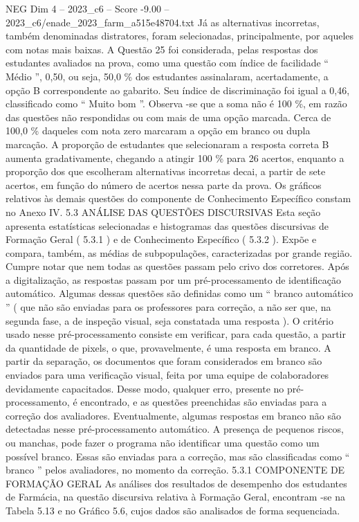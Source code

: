\begin{textsample}{NEG Dim 4 – 2023\_c6 – Score -9.00 – 2023\_c6/enade\_2023\_farm\_a515e48704.txt}
Já as alternativas incorretas, também denominadas distratores, foram selecionadas, principalmente, por aqueles com notas mais baixas.
A Questão 25 foi considerada, pelas respostas dos estudantes avaliados na prova, como uma questão com índice de facilidade “ Médio ”, 0,50, ou seja, 50,0 \% dos estudantes assinalaram, acertadamente, a opção B correspondente ao gabarito.
Seu índice de discriminação foi igual a 0,46, classificado como “ Muito bom ”.
Observa -se que a soma não é 100 \%, em razão das questões não respondidas ou com mais de uma opção marcada.
Cerca de 100,0 \% daqueles com nota zero marcaram a opção em branco ou dupla marcação.
A proporção de estudantes que selecionaram a resposta correta B aumenta gradativamente, chegando a atingir 100 \% para 26 acertos, enquanto a proporção dos que escolheram alternativas incorretas decai, a partir de sete acertos, em função do número de acertos nessa parte da prova.
Os gráficos relativos às demais questões do componente de Conhecimento Específico constam no Anexo IV. 5.3 ANÁLISE DAS QUESTÕES DISCURSIVAS Esta seção apresenta estatísticas selecionadas e histogramas das questões discursivas de Formação Geral ( 5.3.1 ) e de Conhecimento Específico ( 5.3.2 ).
Expõe e compara, também, as médias de subpopulações, caracterizadas por grande região.
Cumpre notar que nem todas as questões passam pelo crivo dos corretores.
Após a digitalização, as respostas passam por um pré-processamento de identificação automático.
Algumas dessas questões são definidas como um “ branco automático ” ( que não são enviadas para os professores para correção, a não ser que, na segunda fase, a de inspeção visual, seja constatada uma resposta ).
O critério usado nesse pré-processamento consiste em verificar, para cada questão, a partir da quantidade de pixels, o que, provavelmente, é uma resposta em branco.
A partir da separação, os documentos que foram considerados em branco são enviados para uma verificação visual, feita por uma equipe de colaboradores devidamente capacitados.
Desse modo, qualquer erro, presente no pré-processamento, é encontrado, e as questões preenchidas são enviadas para a correção dos avaliadores.
Eventualmente, algumas respostas em branco não são detectadas nesse pré-processamento automático.
A presença de pequenos riscos, ou manchas, pode fazer o programa não identificar uma questão como um possível branco.
Essas são enviadas para a correção, mas são classificadas como “ branco ” pelos avaliadores, no momento da correção. 5.3.1 COMPONENTE DE FORMAÇÃO GERAL As análises dos resultados de desempenho dos estudantes de Farmácia, na questão discursiva relativa à Formação Geral, encontram -se na Tabela 5.13 e no Gráfico 5.6, cujos dados são analisados de forma sequenciada.

\end{textsample}
